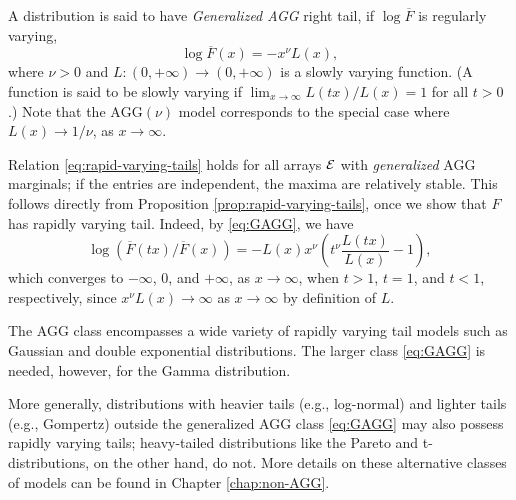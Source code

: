 \begin{example} \label{exmp:AGG}
A distribution is said to have \emph{Generalized AGG} right tail, if $\log{\overline{F}}$ is regularly varying,
\begin{equation} \label{eq:GAGG}
    \log{\overline{F}(x)} = - x^\nu L(x),
\end{equation}
where $\nu>0$ and $L: (0,+\infty)\to(0,+\infty)$ is a slowly varying function. (A function is said to be slowly varying if $\lim_{x\to\infty}L(tx)/L(x) = 1$ for all $t>0$.) Note that the $\text{AGG}(\nu)$ model corresponds to the special case where $L(x)\to 1/\nu$, as $x\to\infty$.

Relation \eqref{eq:rapid-varying-tails} holds for all arrays $\cal E$ with \emph{generalized} AGG marginals; if the entries are independent, the maxima are relatively stable. 
This follows directly from Proposition \ref{prop:rapid-varying-tails}, once we show that $F$ has rapidly varying tail. 
Indeed, by \eqref{eq:GAGG}, we have
$$
\log{\left(\overline{F}(tx)\Big/ \overline{F}(x)\right)} = - L(x)x^\nu\left(t^\nu\frac{L(tx)}{L(x)} - 1\right),
$$
which converges to $-\infty$, 0, and $+\infty$, as $x\to\infty$, when $t>1$, $t=1$, and $t<1$, respectively, since $x^\nu L(x)\to\infty$ as $x\to\infty$ by definition of $L$.
\end{example}


The \ac{AGG} class encompasses a wide variety of rapidly varying tail models such as Gaussian and double exponential distributions. The larger class \eqref{eq:GAGG} is needed, however, for the Gamma distribution.

More generally, distributions with heavier tails (e.g., log-normal) and lighter tails (e.g., Gompertz) outside the generalized AGG class \eqref{eq:GAGG} may also possess rapidly varying tails;
heavy-tailed distributions like the Pareto and t-distributions, on the other hand, do not.   More details on these alternative classes of models can be 
found in Chapter \ref{chap:non-AGG}.


